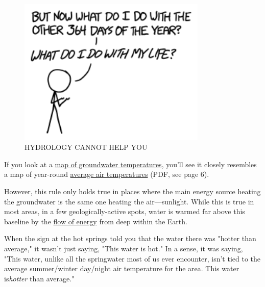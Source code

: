 {\begin{figure}[!htbp]
\centering
\includegraphics[scale=0.5, max width=0.8\textwidth]{imgs/a/132/rest.png}
\caption{HYDROLOGY CANNOT HELP YOU}
\end{figure}

{If you look at a \href{http://www.epa.gov/athens/learn2model/part-two/onsite/ex/jne\_henrys\_map.html}{map of groundwater temperatures}, you'll see it closely resembles a map of year-round \href{http://www1.ncdc.noaa.gov/pub/data/images/olstore/SelClimMapsPubOnlineReduced\_3.pdf}{average air temperatures} (PDF, see page 6).}

{However, this rule only holds true in places where the main energy source heating the groundwater is the same one heating the air—sunlight. While this is true in most areas, in a few geologically-active spots, water is warmed far above this baseline by the \href{http://seismo.berkeley.edu/\~manga/paper75.pdf}{flow of energy} from deep within the Earth.}

{When the sign at the hot springs told you that the water there was "hotter than average," it wasn't just saying, "This water is hot." In a sense, it was saying, "This water, unlike all the springwater most of us ever encounter, isn't tied to the average summer/winter day/night air temperature for the area. This water is\emph{hotter} than average."}

}
